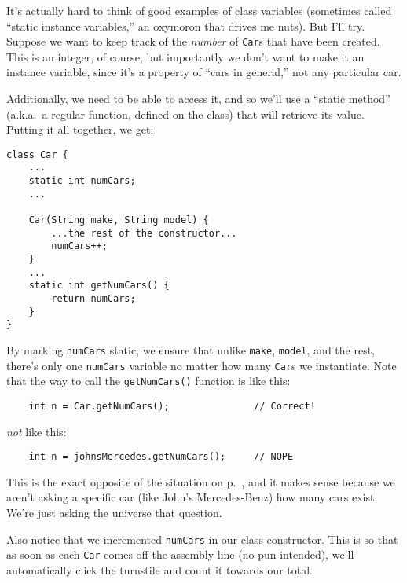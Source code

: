 \smallskip

It's actually hard to think of good examples of class variables (sometimes
called ``static instance variables,'' an oxymoron that drives me nuts). But
I'll try. Suppose we want to keep track of the \textit{number} of \texttt{Car}s
that have been created. This is an integer, of course, but importantly we don't
want to make it an instance variable, since it's a property of ``cars in
general,'' not any particular car.

Additionally, we need to be able to access it, and so we'll use a ``static
method'' (a.k.a.~a regular function, defined on the class) that will retrieve
its value. Putting it all together, we get:

\vspace{.15in}
\begin{Verbatim}[fontsize=\small,samepage=true,frame=single,framesep=3mm]
class Car {
    ...
    static int numCars;
    ...

    Car(String make, String model) {
        ...the rest of the constructor...
        numCars++;
    }
    ...
    static int getNumCars() {
        return numCars;
    }
}
\end{Verbatim}

By marking \texttt{numCars} static, we ensure that unlike \texttt{make},
\texttt{model}, and the rest, there's only one \texttt{numCars} variable no
matter how many \texttt{Car}s we instantiate. Note that the way to call the
\texttt{getNumCars()} function is like this:

\begin{verbatim}
    int n = Car.getNumCars();               // Correct!
\end{verbatim}

\textit{not} like this:

\begin{verbatim}
    int n = johnsMercedes.getNumCars();     // NOPE
\end{verbatim}

This is the exact opposite of the situation on p.~\pageref{callMethodOnObject},
and it makes sense because we aren't asking a specific car (like John's
Mercedes-Benz) how many cars exist. We're just asking the universe that
question.

\smallskip
Also notice that we incremented \texttt{numCars} in our class constructor. This
is so that as soon as each \texttt{Car} comes off the assembly line (no pun
intended), we'll automatically click the turnstile and count it towards our
total.

